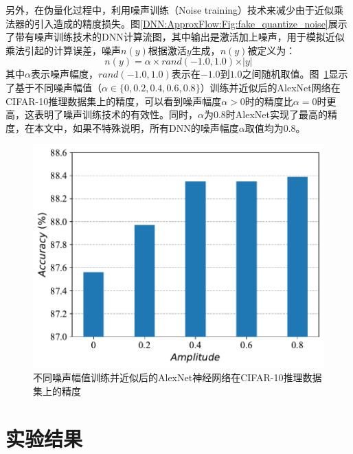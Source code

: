 另外，在伪量化\cite{DNN:fake_quanti}过程中，利用噪声训练（Noise training）技术来减少由于近似乘法器的引入造成的精度损失。图\ref{DNN:ApproxFlow:Fig:fake_quantize_noise}展示了带有噪声训练技术的DNN计算流图，其中输出是激活加上噪声，用于模拟近似乘法引起的计算误差，噪声$n(y)$根据激活$y$生成，$n(y)$被定义为：
\begin{equation}
    \label{DNN:ApproxFlow:Eq:noise}
    n(y) = \alpha \times rand(-1.0, 1.0) \times \vert y \vert
\end{equation}
其中$\alpha$表示噪声幅度，$rand(-1.0,1.0)$表示在$-1.0$到$1.0$之间随机取值。图~\ref{DNN:ApproxFlow:Fig:noise}显示了基于不同噪声幅值（$\alpha \in \{0,0.2,0.4,0.6,0.8\}$）训练并近似后的AlexNet网络\cite{DNN:AlexNet}在CIFAR-10\cite{DNN:CIFAR-10}推理数据集上的精度，可以看到噪声幅度$\alpha > 0$时的精度比$\alpha = 0$时更高，这表明了噪声训练技术的有效性。同时，$\alpha$为0.8时AlexNet实现了最高的精度，在本文中，如果不特殊说明，所有DNN的噪声幅度$\alpha$取值均为$0.8$。
\begin{figure}[!ht]
    \centering
    \includegraphics[width=0.7\linewidth]{./figs/DNN-ApproxFlow_noise.pdf}
    \caption{不同噪声幅值训练并近似后的AlexNet神经网络在CIFAR-10推理数据集上的精度}
    \label{DNN:ApproxFlow:Fig:noise}
\end{figure}

\section{实验结果} \label{ASIC实验结果}

